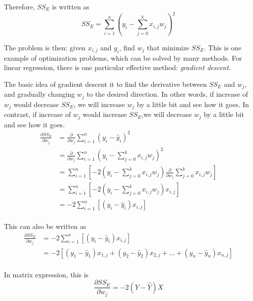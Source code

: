 \documentclass[
	letterpaper
]{article}
\begin{document}
Therefore, $SS_E$ is written as
\begin{equation}
SS_E = \sum_{i = 1}^n (y_i - \sum_{j=0} ^k x_{i, j}w_j) ^2
\end{equation}

The problem is then: given $x_{i, j}$ and $y_i$, find $w_j$ that minimize $SS_E$.
This is one example of optimization problems, which can be solved by many methods.
For linear regression, there is one particular effective method: \textit{gradient descent}.

The basic idea of gradient descent it to find the derivative between $SS_E$ and $w_j$, and gradually changing $w_j$ to the desired direction.
In other words, if increase of $w_j$ would decrease $SS_E$, we will increase $w_j$ by a little bit and see how it goes. 
In contrast, if increase of $w_j$ would increase $SS_E$,we will decrease $w_j$ by a little bit and see how it goes. 
\begin{equation}
\begin{split}
\frac{\partial SS_E}{\partial w_j} & = \frac{\partial}{\partial w_j} \sum_{i = 1}^n (y_i - \hat y_i) ^2 \\
&= \frac{\partial}{\partial w_j}\sum_{i = 1}^n (y_i - \sum_{j=0} ^k x_{i, j}w_j) ^2\\
& = \sum_{i = 1}^n \left[-2(y_i - \sum_{j=0} ^k x_{i, j}w_j)  \frac{\partial}{\partial w_j}\sum_{j=0} ^k x_{i, j}w_j \right]\\
& = \sum_{i = 1}^n \left[ -2(y_i - \sum_{j=0} ^k x_{i, j}w_j)  x_{i, j}\right] \\
& = -2\sum_{i = 1}^n\left[(y_i - \hat y_i)  x_{i, j}\right]\\
\end{split}
\end{equation}

This can also be written as 
\begin{equation}
\begin{split}
\frac{\partial SS_E}{\partial w_j} & =-2\sum_{i = 1}^n\left[(y_i - \hat y_i)  x_{i,j}\right]\\
&=-2\left[(y_1 - \hat y_1)  x_{1,j} + (y_2 - \hat y_2)  x_{2,j} + ... + (y_n - \hat y_n)  x_{n,j}\right]\\
\end{split}
\end{equation}

In matrix expression, this is
\begin{equation}
\frac{\partial SS_E}{\partial w_j} = -2 (Y - \hat Y)X
\end{equation}
\end{document}
